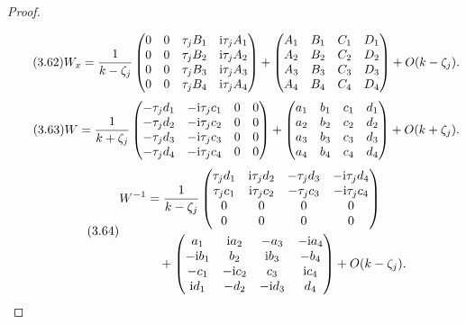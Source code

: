 \begin{proof}
\begin{align}
\end{align}
\begin{equation}\originaleq{3.62}
W_x=\dfrac{1}{k-\zeta_j}\begin{pmatrix}0&0&\tau_j B_1&\ii\tau_j A_1\\0&0&\tau_j B_2&\ii\tau_j A_2\\0&0&\tau_j B_3&\ii\tau_j A_3\\0&0&\tau_j B_4&\ii\tau_j A_4\end{pmatrix}
+\begin{pmatrix}A_1&B_1&C_1&D_1\\A_2&B_2&C_2&D_2\\A_3&B_3&C_3&D_3\\A_4&B_4&C_4&D_4\end{pmatrix}+O(k-\zeta_j).
\end{equation}
\begin{equation}\originaleq{3.63}
W=\dfrac{1}{k+\zeta_j}\begin{pmatrix}-\tau_jd_1&-\ii\tau_jc_1&0&0\\-\tau_jd_2&-\ii\tau_jc_2&0&0\\-\tau_jd_3&-\ii\tau_jc_3&0&0\\-\tau_jd_4&-\ii\tau_jc_4&0&0\end{pmatrix}
+\begin{pmatrix}a_1&b_1&c_1&d_1\\a_2&b_2&c_2&d_2\\a_3&b_3&c_3&d_3\\a_4&b_4&c_4&d_4\end{pmatrix}+O(k+\zeta_j).
\end{equation}
\begin{equation}\originaleq{3.64}
\begin{aligned}
W^{-1}&=\dfrac{1}{k-\zeta_j}\begin{pmatrix}\tau_jd_1&\ii\tau_jd_2&-\tau_jd_3&-\ii\tau_jd_4\\\tau_jc_1&\ii\tau_jc_2&-\tau_jc_3&-\ii\tau_jc_4\\0&0&0&0\\0&0&0&0\end{pmatrix}\\
&\quad+\begin{pmatrix}a_1&\ii a_2&-a_3&-\ii a_4\\-\ii b_1&b_2&\ii b_3&-b_4\\-c_1&-\ii c_2&c_3&\ii c_4\\\ii d_1&-d_2&-\ii d_3&d_4\end{pmatrix}+O(k-\zeta_j).

\end{aligned}
\end{equation}
\end{proof}
